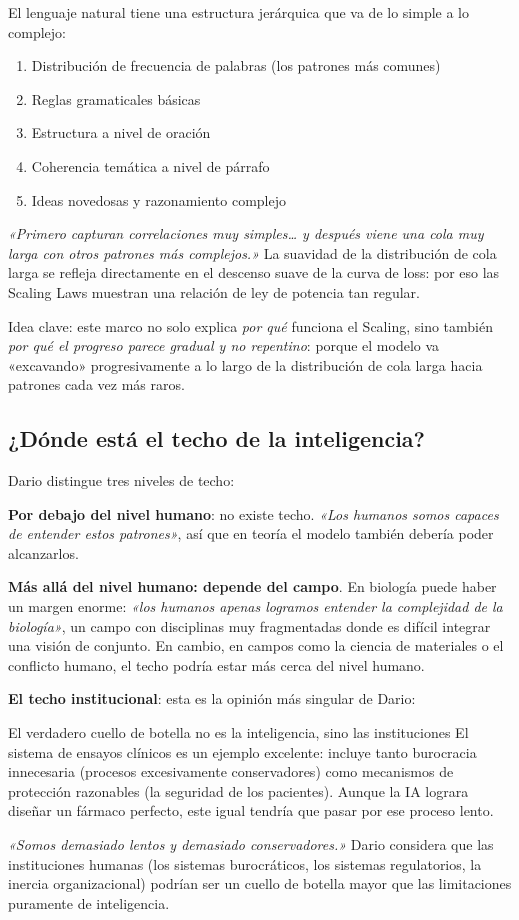 El lenguaje natural tiene una estructura jerárquica que va de lo simple a lo complejo:
\begin{enumerate}
    \item Distribución de frecuencia de palabras (los patrones más comunes)
    \item Reglas gramaticales básicas
    \item Estructura a nivel de oración
    \item Coherencia temática a nivel de párrafo
    \item Ideas novedosas y razonamiento complejo
\end{enumerate}

\textit{«Primero capturan correlaciones muy simples… y después viene una cola muy larga con otros patrones más complejos.»} La suavidad de la distribución de cola larga se refleja directamente en el descenso suave de la curva de loss: por eso las Scaling Laws muestran una relación de ley de potencia tan regular.

Idea clave: este marco no solo explica \textit{por qué} funciona el Scaling, sino también \textit{por qué el progreso parece gradual y no repentino}: porque el modelo va «excavando» progresivamente a lo largo de la distribución de cola larga hacia patrones cada vez más raros.

\subsection{¿Dónde está el techo de la inteligencia?}

Dario distingue tres niveles de techo:

\textbf{Por debajo del nivel humano}: no existe techo. \textit{«Los humanos somos capaces de entender estos patrones»}, así que en teoría el modelo también debería poder alcanzarlos.

\textbf{Más allá del nivel humano: depende del campo}. En biología puede haber un margen enorme: \textit{«los humanos apenas logramos entender la complejidad de la biología»}, un campo con disciplinas muy fragmentadas donde es difícil integrar una visión de conjunto. En cambio, en campos como la ciencia de materiales o el conflicto humano, el techo podría estar más cerca del nivel humano.

\textbf{El techo institucional}: esta es la opinión más singular de Dario:

\begin{warningbox}{El verdadero cuello de botella no es la inteligencia, sino las instituciones}
El sistema de ensayos clínicos es un ejemplo excelente: incluye tanto burocracia innecesaria (procesos excesivamente conservadores) como mecanismos de protección razonables (la seguridad de los pacientes). Aunque la IA lograra diseñar un fármaco perfecto, este igual tendría que pasar por ese proceso lento.

\textit{«Somos demasiado lentos y demasiado conservadores.»} Dario considera que las instituciones humanas (los sistemas burocráticos, los sistemas regulatorios, la inercia organizacional) podrían ser un cuello de botella mayor que las limitaciones puramente de inteligencia.
\end{warningbox}

